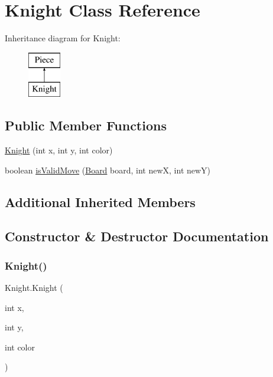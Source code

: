 \hypertarget{class_knight}{}\section{Knight Class Reference}
\label{class_knight}
Inheritance diagram for Knight\+:\begin{figure}[H]
\begin{center}
\leavevmode
\includegraphics[height=2.000000cm]{class_knight}
\end{center}
\end{figure}
\subsection*{Public Member Functions}
\begin{DoxyCompactItemize}
\item 
\mbox{\hyperlink{class_knight_a083ac0daef433a63aa41d1d65cee7ae3}{Knight}} (int x, int y, int color)
\item 
boolean \mbox{\hyperlink{class_knight_a43bfcf7586e969491623ba0048dd84d4}{is\+Valid\+Move}} (\mbox{\hyperlink{class_board}{Board}} board, int newX, int newY)
\end{DoxyCompactItemize}
\subsection*{Additional Inherited Members}


\subsection{Constructor \& Destructor Documentation}
\mbox{\label{class_knight_a083ac0daef433a63aa41d1d65cee7ae3}} 
\subsubsection{\texorpdfstring{Knight()}{Knight()}}
{\footnotesize\ttfamily Knight.\+Knight (\begin{DoxyParamCaption}\item[{int}]{x,  }\item[{int}]{y,  }\item[{int}]{color }\end{DoxyParamCaption})\hspace{0.3cm}{\ttfamily [inline]}}

